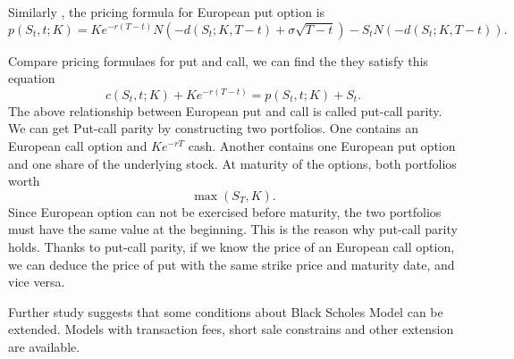 \documentclass[11pt]{book}
\begin{document}
Similarly , the pricing formula for European put option is
\begin{equation}
p(S_t, t;K)= Ke^{-r(T-t)}N(-d(S_t ; K,T-t) +\sigma \sqrt{T-t})-S_t N(-d(S_t;K,T-t)).
\end{equation}

Compare pricing formulaes for put and call, we can find the they satisfy this equation
\begin{equation}
c(S_t,t;K) + K e^{-r(T-t)} = p(S_t,t;K) + S_t.
\end{equation}
The above relationship between European put and call is called put-call parity. We can get Put-call parity by constructing two portfolios. One contains an European call option and $Ke^{-rT}$ cash. Another contains one European put option and one share of the underlying stock. At maturity of the options, both portfolios worth 
\begin{equation}
\max(S_T,K).
\end{equation}
Since European option can not be exercised before maturity, the two portfolios must have the same value at the beginning. This is the reason why put-call parity holds. Thanks to put-call parity, if we know the price of an European call option, we can deduce the price of put with the same strike price and maturity date, and vice versa.


Further study suggests that some conditions about Black Scholes Model can be extended. Models with transaction fees, short sale constrains and other extension are available.
%
\end{document}
